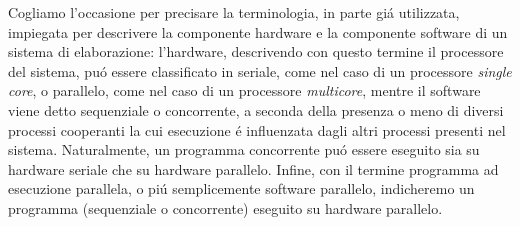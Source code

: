 Cogliamo l'occasione per precisare la terminologia, in parte gi\'a utilizzata, impiegata per descrivere la componente hardware e la componente software di un sistema di elaborazione: l'hardware, descrivendo con questo termine il processore del sistema, pu\'o essere classificato in seriale, come nel caso di un processore \textit{single core}, o parallelo, come nel caso di un processore \textit{multicore}, mentre il software viene detto sequenziale o concorrente, a seconda della presenza o meno di diversi processi cooperanti la cui esecuzione \'e influenzata dagli altri processi presenti nel sistema.\newline
Naturalmente, un programma concorrente pu\'o essere eseguito sia su hardware seriale che su hardware parallelo.\newline
Infine, con il termine programma ad esecuzione parallela, o pi\'u semplicemente software parallelo, indicheremo un programma (sequenziale o concorrente) eseguito su hardware parallelo.